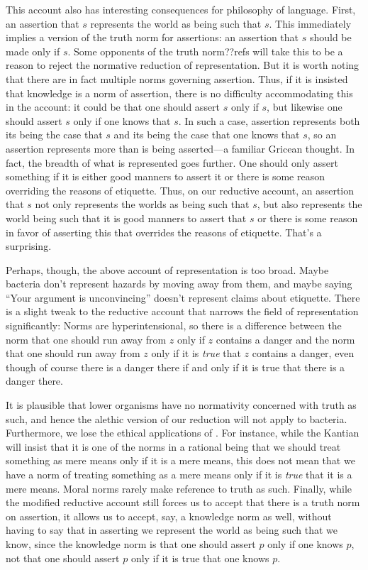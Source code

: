 This account also has interesting consequences for philosophy of language. First, an assertion that 
$s$ represents the world as being such that $s$. This immediately implies a version of the truth norm
for assertions: an assertion that $s$ should be made only if $s$. Some opponents of the truth norm??refs 
will take this to be a reason to reject the normative reduction of representation. But it is worth noting
that there are in fact multiple norms governing assertion. Thus, if it is insisted that knowledge is a norm
of assertion, there is no difficulty accommodating this in the account: it could be that one should
assert $s$ only if $s$, but likewise one should assert $s$ only if one knows that $s$. In such a case, 
assertion represents both its being the case that $s$ and its being the case that one knows that $s$, 
so an assertion represents more than is being asserted---a familiar Gricean thought. In fact, the breadth
of what is represented goes further. One should only assert something 
if it is either good manners to assert it or there is some reason overriding the reasons of 
etiquette. Thus, on our reductive account, an assertion that $s$ not only represents the worlds as being
such that $s$, but also represents the world being such that it is good manners to assert that $s$ or 
there is some reason in favor of asserting this that overrides the reasons of etiquette. That's a 
surprising.

Perhaps, though, the above account of representation is too broad. Maybe bacteria don't represent hazards by 
moving away from them, and maybe saying ``Your argument is unconvincing'' doesn't represent claims about etiquette.
There is a slight tweak to the reductive account that narrows the field of representation significantly:
Norms are hyperintensional, so there is a difference between the norm that one should run away from $z$ only if
$z$ contains a danger and the norm that one should run away from $z$ only if it is \textit{true} that $z$ contains 
a danger, even though of course there is a danger there if and only if it is true that there is a danger there.

It is plausible that lower organisms have no normativity concerned with truth as such, and hence the alethic
version  of our reduction will not apply to bacteria. Furthermore, we lose the ethical 
applications of . For instance, while the Kantian will insist that it is one of the norms 
in a rational being that we should treat something as mere means only if it is a mere means, this does not 
mean that we have a norm of treating something as a mere means only if it is \textit{true} that it is a mere
means. Moral norms rarely make reference to truth as such. Finally, while the modified reductive account still
forces us to accept that there is a truth norm on assertion, it allows us to accept, say, a knowledge norm as 
well, without having to say that in asserting we represent the world as being such that we know, since the 
knowledge norm is that one should assert $p$ only if one knows $p$, not that one should assert $p$ only if 
it is true that one knows $p$. 

